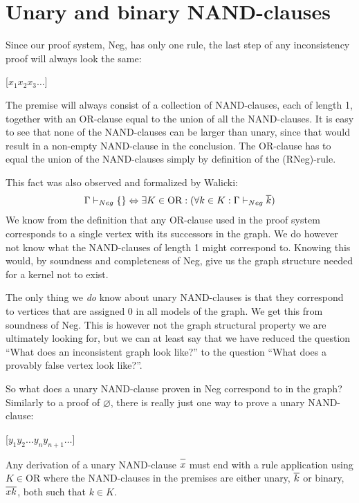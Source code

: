 \section{Unary and binary NAND-clauses}
\label{sec:Unary and binary NAND-clauses}
Since our proof system, Neg, has only one rule, the last step of any inconsistency proof will always look the same:
\begin{prooftree*}
  \Hypo{\dots}
  [$x_1x_2x_3\dots$]{\varnothing}
\end{prooftree*}
The premise will always consist of a collection of NAND-clauses, each of length 1, together with an OR-clause equal to the union of all the NAND-clauses.
It is easy to see that none of the NAND-clauses can be larger than unary, since that would result in a non-empty NAND-clause in the conclusion.
The OR-clause has to equal the union of the NAND-clauses simply by definition of the (RNeg)-rule.

This fact was also observed and formalized by Walicki\cite{michal-completeness}:
\begin{align}
  \Gamma \vdash_{Neg} \{\} \Leftrightarrow \exists K \in \text{OR}: (\forall  k \in K: \Gamma \vdash_{Neg} \ol{k})
\end{align}
We know from the definition that any OR-clause used in the proof system corresponds to a single vertex with its successors in the graph.
We do however not know what the NAND-clauses of length 1 might correspond to.
Knowing this would, by soundness and completeness of Neg, give us the graph structure needed for a kernel not to exist.

The only thing we \textit{do} know about unary NAND-clauses is that they correspond to vertices that are assigned 0 in all models of the graph.
We get this from soundness of Neg.
This is however not the graph structural property we are ultimately looking for, but we can at least say that we have reduced the question ``What does an inconsistent graph look like?'' to the question ``What does a provably false vertex look like?''.

So what does a unary NAND-clause proven in Neg correspond to in the graph?
Similarly to a proof of $\varnothing$, there is really just one way to prove a unary NAND-clause:
\begin{prooftree*}
  \Hypo{\dots}
  \Hypo{\dots}
  [$y_1y_2\dots y_ny_{n+1}\dots$]{}
\end{prooftree*}
Any derivation of a unary NAND-clause $\ol{x}$ must end with a rule application using $K \in \text{OR}$ where the NAND-clauses in the premises are either unary, $\ol{k}$ or binary, $\ol{xk}$, both such that $k \in K$.

